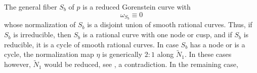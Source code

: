 The general fiber $S_b$ of $p$ is a reduced Gorenstein curve with 
$$ \omega_{S_b} \equiv 0$$ 
whose normalization of $S_b$ is a disjoint union of  smooth rational curves. Thus, if $S_b$ is irreducible, then $S_b$ is a rational curve with one
node or cusp, and if $S_b$ is reducible, it is a cycle of smooth rational curves. In case $S_b$ has a node or is a cycle, the normalization map 
$\eta$ is generically $2:1$ along $\tilde N_1$. In these cases however, $\tilde N_1$ would be reduced, see \cite{KW88}, a contradiction.  In the remaining case, 
